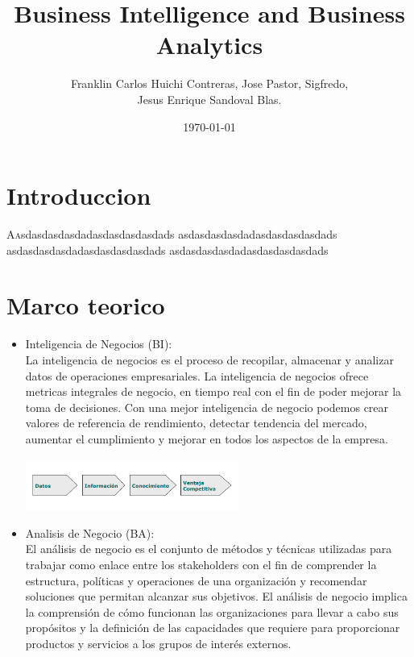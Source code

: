 \documentclass[twoside,twocolumn]{article}
\title{Business Intelligence and Business Analytics}
\author{Franklin Carlos Huichi Contreras, Jose Pastor, Sigfredo, \\
 Jesus Enrique Sandoval Blas. }
\date{\today}
\begin{document}
\maketitle


\section{Introduccion}
\lettrine[nindent=0em,lines=3]{A} asdasdasdasdadasdasdasdasdads asdasdasdasdadasdasdasdasdads asdasdasdasdadasdasdasdasdads asdasdasdasdadasdasdasdasdads



\section{Marco teorico}

\begin{itemize}
\item Inteligencia de Negocios (BI): \\ 
La inteligencia de negocios es el proceso de recopilar, almacenar y analizar datos de operaciones empresariales. La inteligencia de negocios ofrece metricas integrales de negocio,
en tiempo real con el fin de poder mejorar la toma de decisiones. Con una mejor inteligencia de negocio podemos crear valores de referencia de rendimiento, detectar tendencia del mercado,
aumentar el cumplimiento y mejorar en todos los aspectos de la empresa.
\begin{center}
	\includegraphics[width=7cm]{./Imagenes/bi} 
\end{center}

\item Analisis de Negocio (BA): \\ 
El análisis de negocio es el conjunto de métodos y técnicas utilizadas para trabajar como enlace entre los stakeholders con el fin de comprender la estructura, políticas y operaciones de una organización y recomendar soluciones que permitan alcanzar sus objetivos. El análisis de negocio implica la comprensión de cómo funcionan las organizaciones para llevar a cabo sus propósitos y la definición de las capacidades que requiere para proporcionar productos y servicios a los grupos de interés externos.

\end{itemize}
\end{document}
